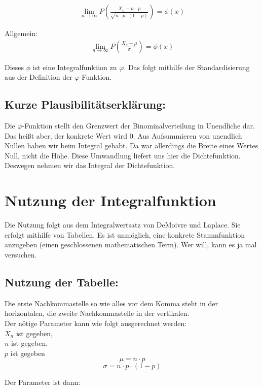 \documentclass[12pt,a4paper,twocolumn]{article}
\begin{document}
\begin{eqnarray}
\lim\limits_{n \rightarrow \infty} P \left(\frac{X_n - n\cdot\ p}{\sqrt{n\cdot\ p\cdot(1 - p)}}\right) = \phi(x)
\end{eqnarray}

Allgemein:
\begin{eqnarray}
\lim\limits_{n \rightarrow \infty} P \left(\frac{X_n - \mu}{\sigma}\right) = \phi(x)
\end{eqnarray}

Dieses $\phi$ ist eine Integralfunktion zu $\varphi$. Das folgt mithilfe der Standardisierung aus der Definition der $\varphi$-Funktion. 

\subsection{Kurze Plausibilitätserklärung:}

Die $\varphi$-Funktion stellt den Grenzwert der Binominalverteilung in Unendliche dar. Das heißt aber, der konkrete Wert wird 0. Aus Aufsummieren von unendlich Nullen haben wir beim Integral gehabt. Da war allerdings die Breite eines Wertes Null, nicht die \glqq Höhe\grqq. Diese Umwandlung liefert uns hier die Dichtefunktion. Deswegen nehmen wir das Integral der Dichtefunktion.

\section{Nutzung der Integralfunktion}
Die Nutzung folgt aus dem Integralwertsatz von DeMoivre und Laplace. Sie erfolgt mithilfe von Tabellen. Es ist unmöglich, eine konkrete Stammfunktion anzugeben (einen geschlossenen mathematischen Term). Wer will, kann es ja mal versuchen.
\subsection{Nutzung der Tabelle:}

Die erste Nachkommastelle so wie alles vor dem Komma steht in der horizontalen, die zweite Nachkommastelle in der vertikalen. 
\\
Der nötige Parameter kann wie folgt ausgerechnet werden:\\
{\center $X_n$ ist gegeben,\\
$n$ ist gegeben,\\
$p$ ist gegeben\\}
$$
\mu = n \cdot p
$$
$$
\sigma = n \cdot p \cdot (1 - p)$$


Der Parameter ist dann:
\end{document}
